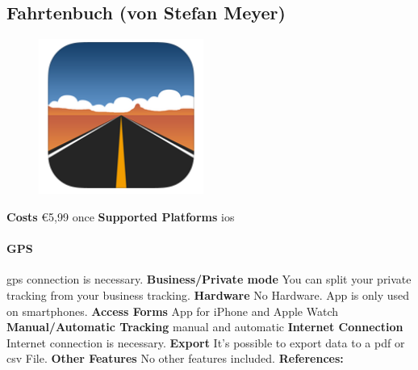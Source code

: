 \begin{singlespace}
\section{Fahrtenbuch (von Stefan Meyer)}
\begin{figure}
  \begin{center}
    \includegraphics[width=0.48\textwidth]{bilder/fahrtenbuch}
  \end{center}
\end{figure}
\textbf{Costs} \euro 5,99 once
\newline\newline
\textbf{Supported Platforms} \gls{ios}
\paragraph{GPS} \gls{gps} connection is necessary.
\newline\newline
\textbf{Business/Private mode} You can split your private tracking from your business tracking.
\newline\newline
\textbf{Hardware} No Hardware. App is only used on smartphones.
\newline\newline
\textbf{Access Forms} App for iPhone and Apple Watch
\newline\newline
\textbf{Manual/Automatic Tracking} manual and automatic
\newline\newline
\textbf{Internet Connection} Internet connection is necessary.
\newline\newline
\textbf{Export} It’s possible to export data to a \gls{pdf} or \gls{csv} File.
\newline\newline
\textbf{Other Features} No other features included.
\newline\newline
\textbf{References:} \cite{Fahrtenbuch_von_Stefan_Meyer}
\newpage
\clearpageauthor

\end{singlespace}

